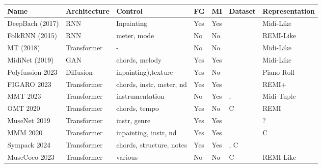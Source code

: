 \begin{table}[H] \label{table:bigtable}
    \centering
    \begin{tabular}{|l|l|l|l|l|l|l|}
        \hline
        \textbf{Name} & \textbf{Architecture} & \textbf{Control} & \textbf{FG} & \textbf{MI} & \textbf{Dataset} & \textbf{Representation} \\
        \hline
        DeepBach (2017) \cite{Hadjeres_Pachet_Nielsen_2017} & RNN & Inpainting & Yes & Yes & \cite{jsbchorales} & Midi-Like\\ 
        FolkRNN (2015) \cite{Sturm_Ben-Tal_2016} & RNN & meter, mode & No & No & \cite{sessionfolkdata} & REMI-Like\\
        MT (2018) \cite{Huang_Vaswani_Uszkoreit_Shazeer_Simon_Hawthorne_Dai_Hoffman_Dinculescu_Eck_2018} & Transformer & - & No & No & \cite{hawthorne2018maestro} \cite{jsbchorales} & Midi-Like\\
        MidiNet (2019) \cite{midinet} & GAN & chords, melody & Yes & Yes & \cite{hooktheorypopmidi} & Midi-Like\\
        Polyfussion 2023 \cite{Min_Jiang_Xia_Zhao_polyffusion_2023} & Diffusion &inpainting),texture & Yes & No & \cite{Wang_Chen_pop90_dataset} & Piano-Roll\\
        FIGARO 2023 \cite{Rütte_figaro_2023} & Transformer & chords, instr, meter, nd & Yes & Yes & \cite{Raffel_2016} & REMI+ \\
        MMT 2023 \cite{Dong_Chen_MMT_Kirkpatrick_2023} & Transformer & instrumentation & No & Yes & \cite{Raffel_2016},\cite{Crestel_OrchestralDataset} & Midi-Tuple \\
        OMT 2020 \cite{Huang_Yang_remi_pop_transformer_2020} & Transformer & chords, tempo & Yes & No & C & REMI\\
        MuseNet 2019 \cite{Christine_2019} & Transformer & instr, genre & Yes & Yes & \cite{hawthorne2018maestro}\cite{classicalarchives}\cite{bitmidi} & ?\\
        MMM 2020 \cite{Ens_Pasquier_2020_MMM} & Transformer & inpainting, instr, nd & Yes & Yes & \cite{Raffel_2016} & C\\
        Sympack 2024 \cite{Chen_Smith_Spijkervet_Wang_Zou_Li_Kong_Du_2024} & Transformer & chords, structure, notes& Yes & Yes & \cite{Raffel_2016} \cite{Bertin-Mahieux_Ellis_Whitman_Lamere_2011}, C &  \\
        MuseCoco 2023 \cite{Lu_Xu_Kang_Yu_Xing_Tan_Bian_MuseCoco_2023} & Transformer & various & No & No & C & REMI-Like\\

\end{tabular}
\end{table}
